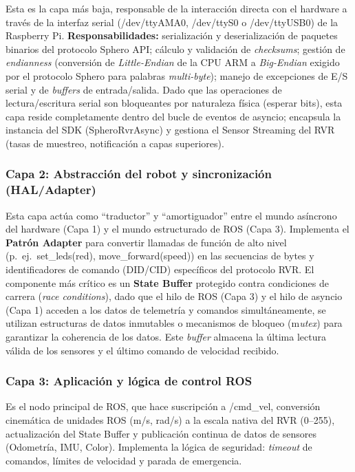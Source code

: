 \documentclass[12pt]{article}
\numberwithin{figure}{section}
\numberwithin{table}{section}
\def\code#1{#1}%
\newcommand{\code}[1]{\textcolor{codeblue}{\url{#1}}}
\begin{document}
Esta es la capa más baja, responsable de la interacción directa con el hardware a través de la interfaz serial (\code{/dev/ttyAMA0}, \code{/dev/ttyS0} o \code{/dev/ttyUSB0}) de la Raspberry Pi. \textbf{Responsabilidades:} serialización y deserialización de paquetes binarios del protocolo Sphero API; cálculo y validación de \textit{checksums}; gestión de \textit{endianness} (conversión de \textit{Little-Endian} de la CPU ARM a \textit{Big-Endian} exigido por el protocolo Sphero para palabras \textit{multi-byte}); manejo de excepciones de E/S serial y de \textit{buffers} de entrada/salida. Dado que las operaciones de lectura/escritura serial son bloqueantes por naturaleza física (esperar bits), esta capa reside completamente dentro del bucle de eventos de asyncio; encapsula la instancia del SDK (SpheroRvrAsync) y gestiona el Sensor Streaming del RVR (tasas de muestreo, notificación a capas superiores).


\subsubsection{Capa 2: Abstracción del robot y sincronización (HAL/Adapter)}

Esta capa actúa como ``traductor'' y ``amortiguador'' entre el mundo asíncrono del hardware (Capa 1) y el 
mundo estructurado de ROS (Capa 3). Implementa el \textbf{Patrón Adapter} para convertir llamadas de función de alto nivel (p.\ ej.\ \code{set\_leds(red)}, \code{move\_forward(speed)}) en las secuencias de bytes y identificadores de comando (DID/CID) específicos del protocolo RVR. El componente más crítico es un \textbf{State Buffer} protegido contra condiciones de carrera (\emph{race conditions}), dado que el hilo de ROS (Capa 3) y el hilo de asyncio (Capa 1) acceden a los datos de telemetría y comandos simultáneamente, se utilizan estructuras de datos inmutables o mecanismos de bloqueo (m\textit{utex}) para garantizar la coherencia de los datos. Este \textit{buffer} almacena la última lectura válida de los sensores y el último comando de velocidad recibido.


\subsubsection{Capa 3: Aplicación y lógica de control ROS}

Es el nodo principal de ROS, que hace suscripción a \code{/cmd\_vel}, conversión cinemática de unidades ROS (m/s, rad/s) a la escala nativa del RVR (0--255), actualización del State Buffer y publicación continua de datos de sensores (Odometría, IMU, Color). Implementa la lógica de seguridad: \textit{timeout} de comandos, límites de velocidad y parada de emergencia.
\end{document}

